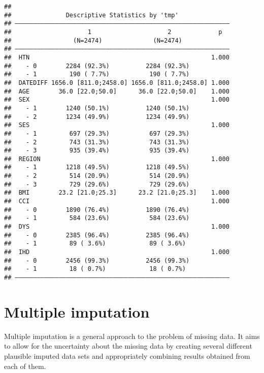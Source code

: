 \documentclass[
]{book}
\begin{document}
\begin{verbatim}
## 
##               Descriptive Statistics by 'tmp'             
## ——————————————————————————————————————————————————————————— 
##                     1                     2             p  
##                 (N=2474)              (N=2474)       
## ——————————————————————————————————————————————————————————— 
##  HTN                                                  1.000
##    - 0        2284 (92.3%)          2284 (92.3%)           
##    - 1         190 ( 7.7%)           190 ( 7.7%)           
##  DATEDIFF 1656.0 [811.0;2458.0] 1656.0 [811.0;2458.0] 1.000
##  AGE        36.0 [22.0;50.0]      36.0 [22.0;50.0]    1.000
##  SEX                                                  1.000
##    - 1        1240 (50.1%)          1240 (50.1%)           
##    - 2        1234 (49.9%)          1234 (49.9%)           
##  SES                                                  1.000
##    - 1         697 (29.3%)           697 (29.3%)           
##    - 2         743 (31.3%)           743 (31.3%)           
##    - 3         935 (39.4%)           935 (39.4%)           
##  REGION                                               1.000
##    - 1        1218 (49.5%)          1218 (49.5%)           
##    - 2         514 (20.9%)           514 (20.9%)           
##    - 3         729 (29.6%)           729 (29.6%)           
##  BMI        23.2 [21.0;25.3]      23.2 [21.0;25.3]    1.000
##  CCI                                                  1.000
##    - 0        1890 (76.4%)          1890 (76.4%)           
##    - 1         584 (23.6%)           584 (23.6%)           
##  DYS                                                  1.000
##    - 0        2385 (96.4%)          2385 (96.4%)           
##    - 1         89 ( 3.6%)            89 ( 3.6%)            
##  IHD                                                  1.000
##    - 0        2456 (99.3%)          2456 (99.3%)           
##    - 1         18 ( 0.7%)            18 ( 0.7%)            
## ———————————————————————————————————————————————————————————
\end{verbatim}

\hypertarget{multiple-imputation}{%
\chapter{Multiple imputation}\label{multiple-imputation}}

Multiple imputation is a general approach to the problem of missing data. It aims to allow for the uncertainty about the missing data by creating several different plausible imputed data sets and appropriately combining results obtained from each of them.
\end{document}
